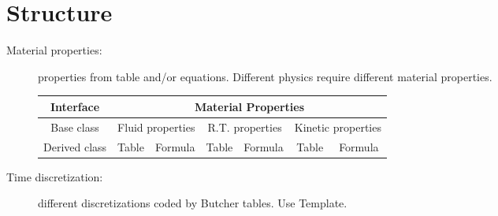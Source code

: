 \documentclass[letterpaper]{report}
\renewcommand{\(}{\left(}
\renewcommand{\)}{\right)}
\renewcommand{\[}{\left[}
\renewcommand{\]}{\right]}
\begin{document}
\section{Structure}
\begin{description}
  \item[Material properties:] properties from table and/or equations.
  Different physics require different material properties.
  \begin{table}[H]
    \centering
    \begin{tabular}{|c|c|c|c|c|c|c|}
      \hline
      Interface & \multicolumn{6}{c|}{Material Properties} \\
      \hline
      Base class & \multicolumn{2}{c|}{Fluid properties} &
      \multicolumn{2}{c|}{R.T. properties} & \multicolumn{2}{c|}{Kinetic properties}
      \\
      \hline
      Derived class & Table & Formula & Table & Formula & Table & Formula \\
      \hline
    \end{tabular}
  \end{table}
  \item[Time discretization:] different discretizations coded by Butcher
  tables. Use Template.
\end{description}
\end{document}
